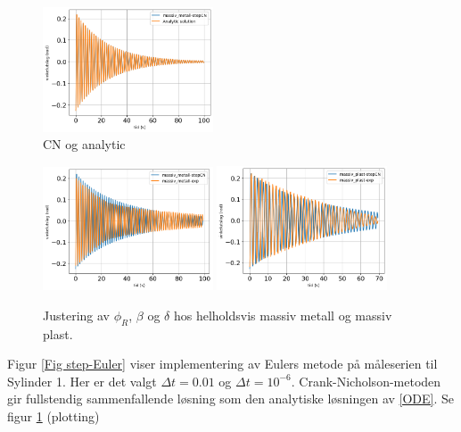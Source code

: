 \documentclass[5p]{elsarticle}
\begin{document}
\begin{figure}[htb] 
	\begin{center}
		\includegraphics[width=0.45\textwidth]{Plots/Saved-Plots/combined-analytic/massiv_metall-stepCN.png}
  
 \end{center}
	\caption{CN og analytic}
	\label{Fig CN} %
\end{figure}

\begin{figure}[htb] 
	\begin{center}
		\includegraphics[width=0.45\textwidth]{Plots/Saved-Plots/Tweaking/Massiv metall/massiv_metall-stepCN.png}
            \includegraphics[width=0.45\textwidth]{Plots/Saved-Plots/Tweaking/Massiv plast/massiv_plast-stepCN copy.png}
 \end{center}
	\caption{Justering av \(\phi_R\), \(\beta\) og \(\delta\) hos helholdsvis massiv metall og massiv plast.}
	\label{Fig tweaking} %
\end{figure}

Figur \ref{Fig step-Euler} viser implementering av Eulers metode på måle\-serien til Sylinder 1. Her er det valgt \(\Delta t = 0.01\) og \(\Delta t = 10^{-6}\). 
Crank-Nicholson-metoden gir fullstendig sammenfallende løsning som den analytiske løsningen av \eqref{ODE}. Se figur \ref{Fig CN}
(plotting)
\end{document}
